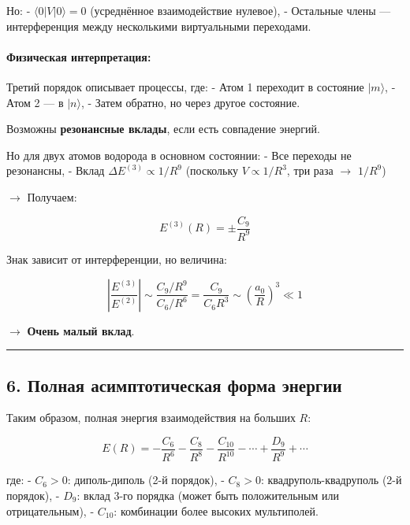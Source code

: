 \documentclass[11pt]{article}
\begin{document}
Но: - \(\langle 0| V |0\rangle = 0\) (усреднённое взаимодействие
нулевое), - Остальные члены --- интерференция между несколькими
виртуальными переходами.

\paragraph{Физическая
интерпретация:}\label{ux444ux438ux437ux438ux447ux435ux441ux43aux430ux44f-ux438ux43dux442ux435ux440ux43fux440ux435ux442ux430ux446ux438ux44f}

Третий порядок описывает процессы, где: - Атом 1 переходит в состояние
\(|m\rangle\), - Атом 2 --- в \(|n\rangle\), - Затем обратно, но через
другое состояние.

Возможны \textbf{резонансные вклады}, если есть совпадение энергий.

Но для двух атомов водорода в основном состоянии: - Все переходы не
резонансны, - Вклад \(\Delta E^{(3)} \propto 1/R^9\) (поскольку
\(V \propto 1/R^3\), три раза $\rightarrow$ \(1/R^9\))

$\rightarrow$ Получаем:

\[
E^{(3)}(R) = \pm \frac{C_9}{R^9}
\]

Знак зависит от интерференции, но величина:

\[
\left| \frac{E^{(3)}}{E^{(2)}} \right| \sim \frac{C_9 / R^9}{C_6 / R^6} = \frac{C_9}{C_6 R^3} \sim \left( \frac{a_0}{R} \right)^3 \ll 1
\]

$\rightarrow$ \textbf{Очень малый вклад}.

\begin{center}\rule{0.5\linewidth}{\linethickness}\end{center}

\subsection{6. Полная асимптотическая форма
энергии}\label{ux43fux43eux43bux43dux430ux44f-ux430ux441ux438ux43cux43fux442ux43eux442ux438ux447ux435ux441ux43aux430ux44f-ux444ux43eux440ux43cux430-ux44dux43dux435ux440ux433ux438ux438}

Таким образом, полная энергия взаимодействия на больших \(R\):

\[
\boxed{
E(R) = -\frac{C_6}{R^6} - \frac{C_8}{R^8} - \frac{C_{10}}{R^{10}} - \cdots + \frac{D_9}{R^9} + \cdots
}
\]

где: - \(C_6 > 0\): диполь-диполь (2-й порядок), - \(C_8 > 0\):
квадруполь-квадруполь (2-й порядок), - \(D_9\): вклад 3-го порядка
(может быть положительным или отрицательным), - \(C_{10}\): комбинации
более высоких мультиполей.
\end{document}
